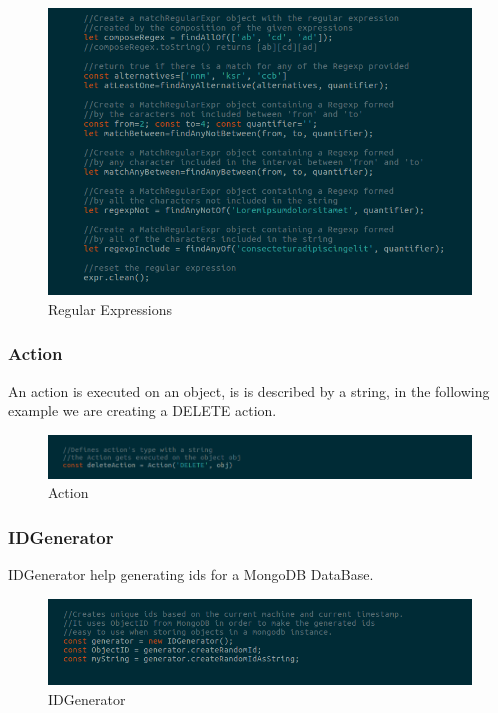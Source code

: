 \begin{figure}[H]
	\centering
	\includegraphics[width=14cm]{../../documenti/UserManualFramework/framework_model/6framework_model_regexp2.png}
	\caption{Regular Expressions}
\end{figure}

\subsubsection{Action}
An action is executed on an object, is is described by a string, in the following example we are creating a DELETE action. 
\begin{figure}[H]
	\centering
	\includegraphics[width=14cm]{../../documenti/UserManualFramework/framework_model/Action.png}
	\caption{Action}
\end{figure}

\subsubsection{IDGenerator}
IDGenerator help generating ids for a MongoDB DataBase. 
\begin{figure}[H]
	\centering
	\includegraphics[width=14cm]{../../documenti/UserManualFramework/framework_model/idGenerator.png}
	\caption{IDGenerator}
\end{figure}

